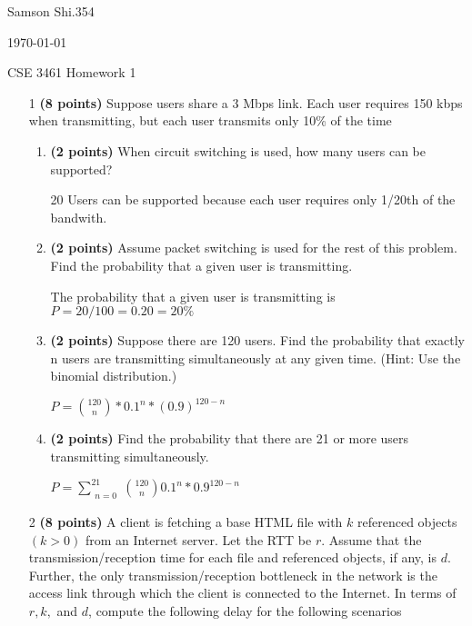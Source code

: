 \documentclass{article}
\begin{document}
\begin{flushright}
Samson Shi.354

\today

CSE 3461 Homework 1
\end{flushright}

\begin{enumerate}

\item[1]\textbf{(8 points)} Suppose users share a 3 Mbps link. Each user requires 150 kbps when transmitting, but each user transmits only 10\% of the time

\begin{enumerate}
  \item \textbf{(2 points)} When circuit switching is used, how many users can be supported? 

  	20 Users can be supported because each user requires only 1/20th of the bandwith.

  \item \textbf{(2 points)} Assume packet switching is used for the rest of this problem. Find the probability that a given user is transmitting.

  	The probability that a given user is transmitting is $P =  20/100 = 0.20 = 20\%$

  \item \textbf{(2 points)} Suppose there are 120 users. Find the probability that exactly n users are transmitting simultaneously at any given time. (Hint: Use the binomial distribution.)

  	$P=\binom{120}{n} * 0.1^n * (0.9)^{120-n}$

  \item \textbf{(2 points)} Find the probability that there are 21 or more users transmitting simultaneously.

  	$P = \sum_{\substack{n=0}}^{21} \binom{120}{n}0.1^n * 0.9^{120-n}$

\end{enumerate}

\item[2]\textbf{(8 points)} A client is fetching a base HTML file with $k$ referenced objects $(k > 0)$ from an Internet server. Let the RTT be $r$. Assume that the transmission/reception time for each file and referenced objects, if any, is $d$. Further, the only transmission/reception bottleneck in the network is the access link through which the client is connected to the Internet. In terms of $r, k,$ and $d$, compute the following delay for the following scenarios


\end{enumerate}
\end{document}
